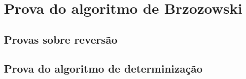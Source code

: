 \chapter{Prova do algoritmo de Brzozowski}

\section{Provas sobre reversão}

\section{Prova do algoritmo de determinização}